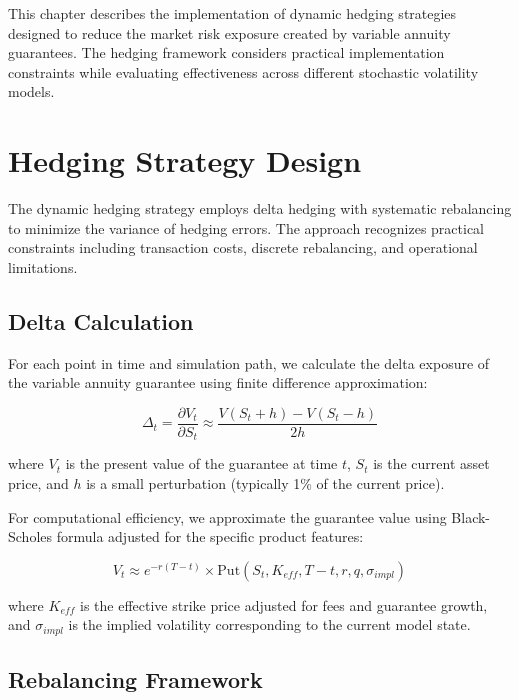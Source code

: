 \documentclass[12pt,a4paper]{report}
\begin{document}
This chapter describes the implementation of dynamic hedging strategies designed to reduce the market risk exposure created by variable annuity guarantees. The hedging framework considers practical implementation constraints while evaluating effectiveness across different stochastic volatility models.

\section{Hedging Strategy Design}

The dynamic hedging strategy employs delta hedging with systematic rebalancing to minimize the variance of hedging errors. The approach recognizes practical constraints including transaction costs, discrete rebalancing, and operational limitations.

\subsection{Delta Calculation}

For each point in time and simulation path, we calculate the delta exposure of the variable annuity guarantee using finite difference approximation:

\begin{equation}
\Delta_t = \frac{\partial V_t}{\partial S_t} \approx \frac{V(S_t + h) - V(S_t - h)}{2h}
\end{equation}

where $V_t$ is the present value of the guarantee at time $t$, $S_t$ is the current asset price, and $h$ is a small perturbation (typically 1\% of the current price).

For computational efficiency, we approximate the guarantee value using Black-Scholes formula adjusted for the specific product features:

\begin{equation}
V_t \approx e^{-r(T-t)} \times \text{Put}(S_t, K_{eff}, T-t, r, q, \sigma_{impl})
\end{equation}

where $K_{eff}$ is the effective strike price adjusted for fees and guarantee growth, and $\sigma_{impl}$ is the implied volatility corresponding to the current model state.

\subsection{Rebalancing Framework}
\end{document}
